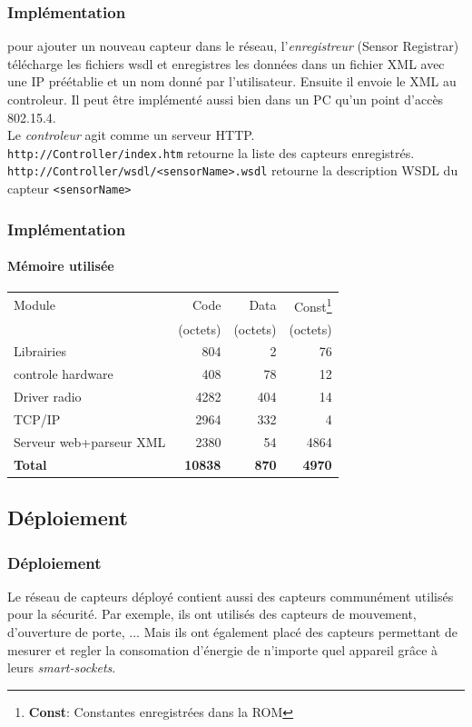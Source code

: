 \begin{frame}
 \frametitle{Implémentation}
 pour ajouter un nouveau capteur dans le réseau, l'\textit{enregistreur} (Sensor Registrar) télécharge les fichiers wsdl et enregistres les données dans un fichier XML avec une IP préétablie et un nom donné par l'utilisateur.
 Ensuite il envoie le XML au controleur.
 Il peut être implémenté aussi bien dans un PC qu'un point d'accès 802.15.4.\\
 \vspace{4mm}
 Le \textit{controleur} agit comme un serveur HTTP.\\
 \texttt{http://Controller/index.htm} retourne la liste des capteurs enregistrés.\\
 \texttt{http://Controller/wsdl/<sensorName>.wsdl} retourne la description WSDL du capteur \texttt{<sensorName>}
\end{frame}


\newcommand{\unite}{(octets)}
\begin{frame}%
 \frametitle{Implémentation}
 \framesubtitle{Mémoire utilisée}
 \begin{center}
 \begin{tabular}{|l|r|r|r|}
  \hline
  Module & Code & Data & Const\footnote{\textbf{Const}: Constantes enregistrées dans la ROM}\\
  ~ & \unite & \unite & \unite \\
  \hline
  Librairies & 804 & 2 & 76\\
  controle hardware & 408 & 78 & 12\\
  Driver radio & 4282 & 404 & 14\\
  TCP/IP & 2964 & 332 & 4\\
  Serveur web+parseur XML & 2380 & 54 & 4864\\
  \hline
  \textbf{Total} & \textbf{10838} & \textbf{870} & \textbf{4970}\\
  \hline
 \end{tabular}
 \end{center}
\end{frame}

\subsection{Déploiement}
\begin{frame}
 \frametitle{Déploiement}
 Le réseau de capteurs déployé contient aussi des capteurs communément utilisés pour la sécurité.
 Par exemple, ils ont utilisés des capteurs de mouvement, d'ouverture de porte, ...
 Mais ils ont également placé des capteurs permettant de mesurer et regler la consomation d'énergie de n'importe quel appareil grâce à leurs \textit{smart-sockets}.
\end{frame}


